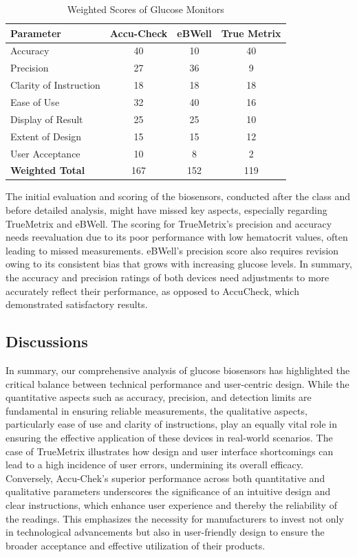 \documentclass[conference]{IEEEtran}
\begin{document}
   \begin{table}[h]
      \centering
      \caption{Weighted Scores of Glucose Monitors}
      \label{tab:weighted_scores}
      \begin{tabular}{lccc}
      \hline
      \textbf{Parameter} & \textbf{Accu-Check} & \textbf{eBWell} & \textbf{True Metrix} \\
      \hline
      Accuracy & 40 & 10 & 40 \\
      Precision & 27 & 36 & 9 \\
      Clarity of Instruction & 18 & 18 & 18 \\
      Ease of Use & 32 & 40 & 16 \\
      Display of Result & 25 & 25 & 10 \\
      Extent of Design & 15 & 15 & 12 \\
      User Acceptance & 10 & 8 & 2 \\
      \hline
      \textbf{Weighted Total} & 167 & 152 & 119 \\
      \hline
      \end{tabular}
      \end{table}

      The initial evaluation and scoring of the biosensors, conducted after the class and before detailed analysis, 
      might have missed key aspects, especially regarding TrueMetrix and eBWell. The scoring for TrueMetrix's precision 
      and accuracy needs reevaluation due to its poor performance with low hematocrit values, often leading to missed measurements. 
      eBWell's precision score also requires revision owing to its consistent bias that grows with increasing glucose levels. 
      In summary, the accuracy and precision ratings of both devices need adjustments to more accurately reflect their performance, 
      as opposed to AccuCheck, which demonstrated satisfactory results.
   
 
 \subsection{Discussions}
 In summary, our comprehensive analysis of glucose biosensors has highlighted 
 the critical balance between technical performance and user-centric design. 
 While the quantitative aspects such as accuracy, precision, and detection 
 limits are fundamental in ensuring reliable measurements, the qualitative 
 aspects, particularly ease of use and clarity of instructions, play an equally 
 vital role in ensuring the effective application of these devices in real-world 
 scenarios. The case of TrueMetrix illustrates how design and user interface 
 shortcomings can lead to a high incidence of user errors, undermining its 
 overall efficacy. Conversely, Accu-Chek's superior performance across both 
 quantitative and qualitative parameters underscores the significance of an 
 intuitive design and clear instructions, which enhance user experience and 
 thereby the reliability of the readings. This emphasizes the necessity for 
 manufacturers to invest not only in technological advancements but also in 
 user-friendly design to ensure the broader acceptance and effective utilization 
 of their products.
 
\end{document}
